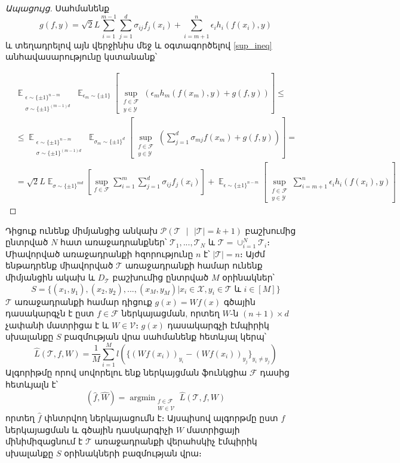 \documentclass[12pt]{article}
\DeclareMathOperator*{\argmin}{argmin}
\DeclareMathOperator*{\E}{\mathbb{E}}
\begin{document}
\begin{proof}[Ապացույց]
Սահմանենք $$g(f, y) = \sqrt{2}L\sum_{i=1}^{m-1}\sum_{j=1}^d{\sigma_{ij}f_j(x_i)}  + \sum_{i = m+1}^n\epsilon_ih_i(f(x_i), y)$$
և տեղադրելով այն վերջինիս մեջ և օգտագործելով \ref{sup_ineq} անհավասարությունը կստանանք՝


\begin{align*}
 &\E_{\substack{\epsilon \sim \{ \pm 1\}^{n-m}   \\ \sigma \sim \{ \pm 1\}^{(m-1)d} }}     \E_{\epsilon_m \sim \{ \pm1 \}} \left [          \sup_{\substack{f \in \mathcal{F} \\ y \in \mathcal{Y}}}     \left(\epsilon_m h_m(f(x_m), y)   +   g(f, y)			\right )	\right ] \leq \\
 &\leq  \E_{\substack{\epsilon \sim \{ \pm 1\}^{n-m}   \\ \sigma \sim \{ \pm 1\}^{(m-1)d} }}     \E_{\sigma_m \sim \{ \pm1 \}^d} \left [          \sup_{\substack{f \in \mathcal{F} \\ y \in \mathcal{Y}}}     \left( \sum_{j = 1}^d  \sigma_{mj}f(x_m) +   g(f, y)			\right )	\right ] =\\
 &= \sqrt{2}L \E_{\sigma \sim \{\pm1\}^{md}} \left[  \sup_{f \in \mathcal{F}}  \sum_{i=1}^m\sum_{j=1}^d{\sigma_{ij}f_j(x_i)}   \right] + \E_{\epsilon \sim \{\pm 1\}^{n-m}}\left[\sup_{\substack{f \in \mathcal{F} \\ y \in \mathcal{Y}} }  \sum_{i=m+1}^n{\epsilon_ih_i(f(x_i), y)}  \right] 
\end{align*}


\end{proof}
  
Դիցուք ունենք միմյանցից անկախ $\mathcal{P}(\mathcal{T} \text{ } |\text{ }  |\mathcal{T}| = k +1)$ բաշխումից ընտրված $N$ հատ առաջադրանքներ՝ $\mathcal{T}_1, ..., \mathcal{T}_N$  և $\mathcal{T} = \cup_{i=1}^N{\mathcal{T}_i}$։ Միավորված առաջադրանքի հզորությունը $n$ է՝  $|\mathcal{T}| =n $։ Այժմ ենթադրենք միավորված $\mathcal{T}$ առաջադրանքի համար ունենք միմյանցին ակախ և $D_{\mathcal{T}}$ բաշխումից ընտրված $M$ օրինակներ՝
$$S = \{(x_1, y_1), (x_2, y_2), ..., (x_M, y_M) | x_i \in \mathcal{X}, y_i \in \mathcal{T} \text{ և } i \in [M] \}$$
$\mathcal{T}$   առաջադրանքի համար դիցուք $g(x) = Wf(x)$ գծային դասակարգչն է ըստ $f \in \mathcal{F}$ ներկայացման, որտեղ $W$-ն $(n+1) \times d$ չափանի մատրիցա է և $W \in \mathcal{V}$։ $g(x)$ դասակարգչի էմպիրիկ սխալանքը $S$ բազմության վրա սահմանենք հետևյալ կերպ՝
$$\hat{L}(\mathcal{T},f, W) = \frac{1}{M}\sum_{i=1}^Ml(\{(Wf(x_i))_{y_i} - (Wf(x_i))_{y_j}\}_{y_i \neq y_j})$$ 
Ալգորիթմը որով սովորելու ենք ներկայցման ֆունկցիա $\mathcal{F}$ դասից հետևյալն է՝
$$(\hat{f}, \hat{W}) = \argmin_{\substack{f \in \mathcal{F} \\ W \in \mathcal{V}}} \hat{L}(\mathcal{T},f, W)$$
որտեղ $\hat{f}$ փնտրվող ներկայացումն է։ Այսպիսով ալգորթմը ըստ $f$ ներկայացման և գծային դասկարգիչի $W$ մատրիցայի  մինիմիզացնում է $\mathcal{T}$ առաջադրանքի վերահսկիչ էմպիրիկ սխալանքը $S$ օրինակների բազմության վրա։
\end{document}
